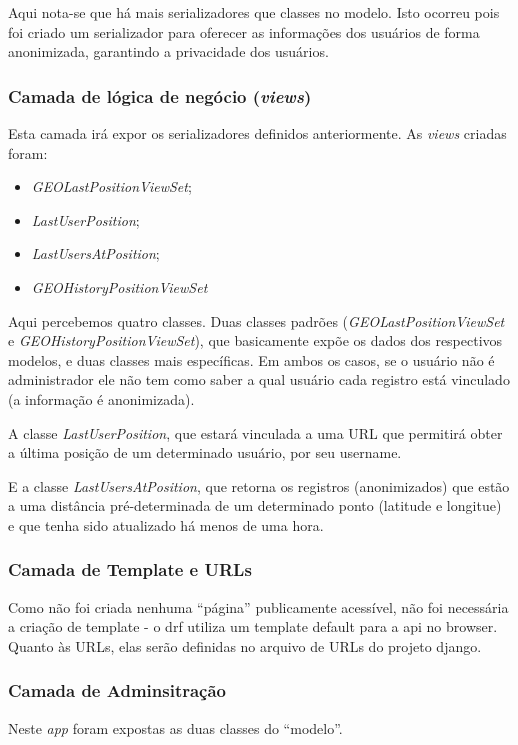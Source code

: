 Aqui nota-se que há mais serializadores que classes no modelo. Isto ocorreu pois foi criado um serializador para oferecer as informações dos usuários de forma anonimizada, garantindo a privacidade dos usuários.

\subsubsection{Camada de lógica de negócio (\textit{views})}
Esta camada irá expor os serializadores definidos anteriormente. As \textit{views} criadas foram: %
\begin{itemize}
    \item \textit{GEOLastPositionViewSet};
    \item \textit{LastUserPosition};
    \item \textit{LastUsersAtPosition};
    \item \textit{GEOHistoryPositionViewSet}
\end{itemize}
Aqui percebemos quatro classes. Duas classes padrões (\mbox{\textit{GEOLastPositionViewSet}} e \mbox{\textit{GEOHistoryPositionViewSet}}), que basicamente expõe os dados dos respectivos modelos, e duas classes mais específicas. Em ambos os casos, se o usuário não é administrador ele não tem como saber a qual usuário cada registro está vinculado (a informação é anonimizada).

A classe \textit{LastUserPosition}, que estará vinculada a uma URL que permitirá obter a última posição de um determinado usuário, por seu username. 

E a classe \textit{LastUsersAtPosition}, que retorna os registros (anonimizados) que estão a uma distância pré-determinada de um determinado ponto (latitude e longitue) e que tenha sido atualizado há menos de uma hora.

\subsubsection{Camada de Template e URLs}
Como não foi criada nenhuma ``página'' publicamente acessível, não foi necessária a criação de template - o \gls{drf} utiliza um template default para a \gls{api} no browser. Quanto às URLs, elas serão definidas no arquivo de URLs do projeto \gls{django}.

\subsubsection{Camada de Adminsitração}
Neste \textit{app} foram expostas as duas classes do ``modelo''.

